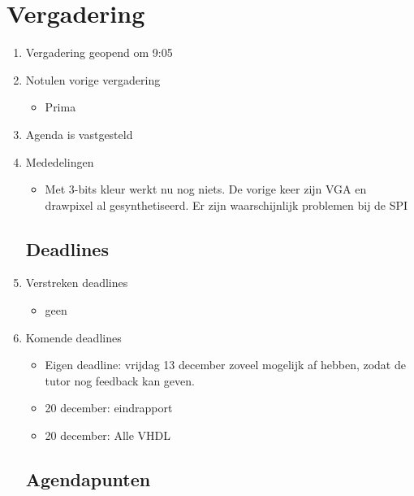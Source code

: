\documentclass{article}
\begin{document}
\section*{Vergadering}
\begin{enumerate}
	
	\subsection*{Vooraf}
	\item Vergadering geopend om 9:05%
	\item Notulen vorige vergadering
	\begin{itemize}
		\item Prima
	\end{itemize}
	\item Agenda is vastgesteld
	\item Mededelingen
	\begin{itemize}
		\item Met 3-bits kleur werkt nu nog niets. De vorige keer zijn VGA en drawpixel al gesynthetiseerd. Er zijn waarschijnlijk problemen bij de SPI
	\end{itemize}

	\subsection*{Deadlines}
	\item Verstreken deadlines
	\begin{itemize}
		\item geen
	\end{itemize}
	\item Komende deadlines
	\begin{itemize}
		\item Eigen deadline: vrijdag 13 december zoveel mogelijk af hebben, zodat de tutor nog feedback kan geven. 
		\item 20 december: eindrapport
		\item 20 december: Alle VHDL
	\end{itemize}

	\subsection*{Agendapunten}
	


\end{enumerate}
\end{document}
